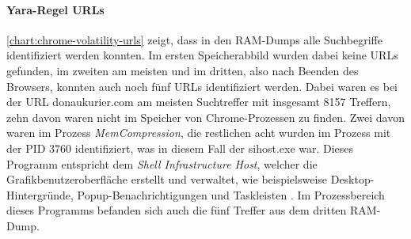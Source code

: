 \paragraph*{Yara-Regel \glqq{}URLs\grqq{}}\label{chap:ergebnisse-chrome-uncommon-volatility-urls}

\autoref{chart:chrome-volatility-urls} zeigt, dass in den RAM-Dumps alle Suchbegriffe identifiziert werden konnten. Im ersten Speicherabbild wurden dabei keine URLs gefunden, im zweiten am meisten und im dritten, also nach Beenden des Browsers, konnten auch noch fünf URLs identifiziert werden. Dabei waren es bei der URL \glqq{}donaukurier.com\grqq{} am meisten Suchtreffer mit insgesamt 8157 Treffern, zehn davon waren nicht im Speicher von Chrome-Prozessen zu finden. Zwei davon waren im Prozess \textit{MemCompression}, die restlichen acht wurden im Prozess mit der PID 3760 identifiziert, was in diesem Fall der sihost.exe war. Dieses Programm entspricht dem \textit{Shell Infrastructure Host}, welcher die Grafikbenutzeroberfläche erstellt und verwaltet, wie beispielsweise Desktop-Hintergründe, Popup-Benachrichtigungen und Taskleisten \cite{SiHostWebsite}. Im Prozessbereich dieses Programms befanden sich auch die fünf Treffer aus dem dritten RAM-Dump.

